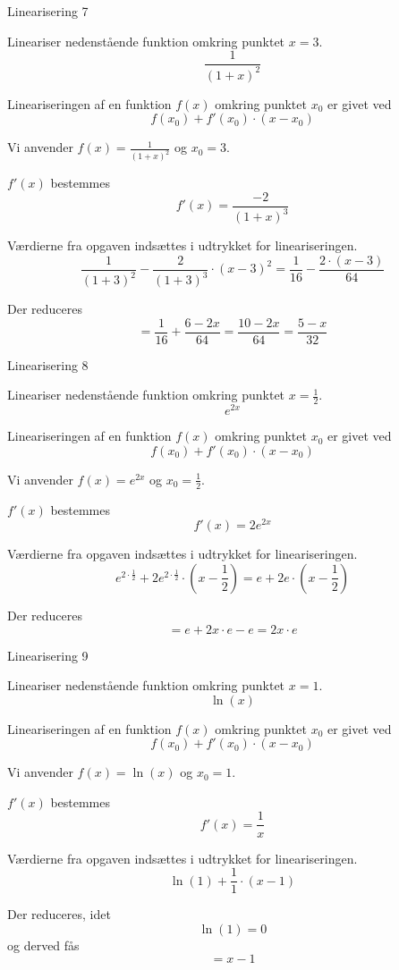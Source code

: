 \documentclass{article}
\begin{document}
\begin{exercise}{Linearisering 7}
	
	Lineariser nedenstående funktion omkring punktet $x = 3$.
	\[
	\frac{1}{(1+x)^2}
	\]
	
	
	\hint
	Lineariseringen af en funktion $f(x)$
	omkring punktet $x_0$ er givet ved
	\[
	f(x_0) + f'(x_0) \cdot (x - x_0)
	\]
	
	\hint
	Vi anvender $f(x) = \frac{1}{(1+x)^2}$ og $x_0 = 3$.
	
	\hint
	$f'(x)$ bestemmes
	\[
	f'(x) = \frac{-2}{(1+x)^3}
	\]
	
	\hint
	Værdierne fra opgaven indsættes i udtrykket for lineariseringen.
	\[
	\frac{1}{(1+3)^2} - \frac{2}{(1+3)^3} \cdot (x-3)^2 = \frac{1}{16} - \frac{2 \cdot (x - 3)}{64}
	\]
	
	\hint
	Der reduceres
	\[
	= \frac{1}{16} + \frac{6 - 2x}{64} = \frac{10 - 2x}{64} = \frac{5-x}{32}
	\]
	
\end{exercise}

\begin{exercise}{Linearisering 8}
	
	Lineariser nedenstående funktion omkring punktet $x = \frac{1}{2}$.
	\[
	e^{2x}
	\]
	
	
	\hint
	Lineariseringen af en funktion $f(x)$
	omkring punktet $x_0$ er givet ved
	\[
	f(x_0) + f'(x_0) \cdot (x - x_0)
	\]
	
	\hint
	Vi anvender $f(x) = e^{2x}$ og $x_0 = \frac{1}{2}$.
	
	\hint
	$f'(x)$ bestemmes
	\[
	f'(x) = 2 e^{2x}
	\]
	
	\hint
	Værdierne fra opgaven indsættes i udtrykket for lineariseringen.
	\[
	e^{2 \cdot \frac{1}{2}} + 2 e^{2 \cdot \frac{1}{2}} \cdot (x - \frac{1}{2}) = e + 2 e \cdot (x - \frac{1}{2})
	\]
	
	\hint
	Der reduceres
	\[
	= e + 2x \cdot e - e = 2x \cdot e
	\]
	
\end{exercise}

\begin{exercise}{Linearisering 9}
	
	Lineariser nedenstående funktion omkring punktet $x = 1$.
	\[
	\ln(x)	
	\]
	
	
	\hint
	Lineariseringen af en funktion $f(x)$
	omkring punktet $x_0$ er givet ved
	\[
	f(x_0) + f'(x_0) \cdot (x - x_0)
	\]
	
	\hint
	Vi anvender $f(x) = \ln(x)$ og $x_0 = 1$.
	
	\hint
	$f'(x)$ bestemmes
	\[
	f'(x) = \frac{1}{x}
	\]
	
	\hint
	Værdierne fra opgaven indsættes i udtrykket for lineariseringen.
	\[
	\ln(1) + \frac{1}{1} \cdot (x - 1) 
	\]
	
	\hint
	Der reduceres, idet
	\[
	\ln(1) = 0
	\]
	og derved fås
	\[
	= x - 1
	\]
	
\end{exercise}
\end{document}
